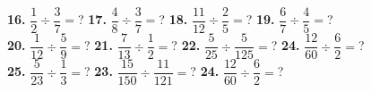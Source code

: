 \documentclass[a4paper]{article}
\begin{document}
\begin{Large}
\textbf{16.} $\dfrac{1}{2} \div \dfrac{3}{7} =$? \hspace{0.2cm}
\textbf{17.} $\dfrac{4}{8} \div \dfrac{3}{7} =$? \hspace{0.2cm}
\textbf{18.} $\dfrac{11}{12} \div \dfrac{2}{5} =$? \hspace{0.2cm}
\textbf{19.} $\dfrac{6}{7} \div \dfrac{4}{5} =$?  \\[0.75cm]
\textbf{20.} $\dfrac{1}{12} \div \dfrac{5}{9} =$? \hspace{0.2cm}
\textbf{21.} $\dfrac{7}{13} \div \dfrac{1}{2} =$? \hspace{0.2cm}
\textbf{22.} $\dfrac{5}{25} \div \dfrac{5}{125} =$? \hspace{0.2cm}
\textbf{24.} $\dfrac{12}{60} \div \dfrac{6}{2} =$?  \\[0.75cm]
\textbf{25.} $\dfrac{5}{23} \div \dfrac{1}{3} =$? \hspace{0.2cm}
\textbf{23.} $\dfrac{15}{150} \div \dfrac{11}{121} =$? \hspace{0.2cm}
\textbf{24.} $\dfrac{12}{60} \div \dfrac{6}{2} =$?

\end{Large}
\end{document}
